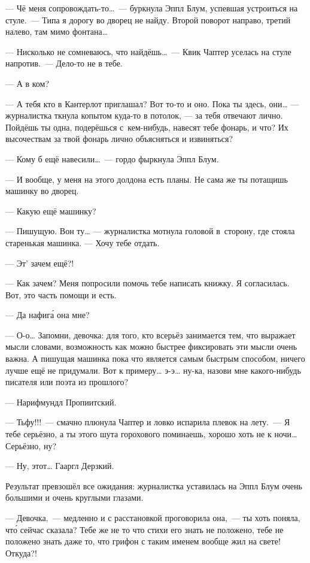 \documentclass[fontsize=11pt,a5paper,titlepage=firstcover]{scrbook}
\begin{document}
--- Чё меня сопровождать-то{\ldots}~--- буркнула Эппл Блум, успевшая устроиться на стуле.~--- Типа я дорогу во дворец не найду. Второй поворот направо, третий налево, там мимо фонтана{\ldots}

--- Нисколько не сомневаюсь, что найдёшь{\ldots}~--- Квик Чаптер уселась на стуле напротив.~--- Дело-то не в тебе.

--- А в ком?

--- А тебя кто в Кантерлот приглашал? Вот то-то и оно. Пока ты здесь, они{\ldots} --- журналистка ткнула копытом куда-то в потолок, --- за тебя отвечают лично. Пойдёшь ты одна, подерёшься с~кем-нибудь, навесят тебе фонарь, и что? Их высочествам за твой фонарь лично объясняться и извиняться?

--- Кому б ещё навесили{\ldots}~--- гордо фыркнула Эппл Блум.

--- И вообще, у меня на этого долдона есть планы. Не сама же ты потащишь машинку во дворец.

--- Какую ещё машинку?

--- Пишущую. Вон ту{\ldots} --- журналистка мотнула головой в~сторону, где стояла старенькая машинка. --- Хочу тебе отдать.

--- Эт’ зачем ещё?!

--- Как зачем? Меня попросили помочь тебе написать книжку. Я согласилась. Вот, это часть помощи и есть.

--- Да нафига́ она мне?

--- О-о{\ldots} Запомни, девочка: для того, кто всерьёз занимается тем, что выражает мысли словами, возможность как можно быстрее фиксировать эти мысли очень важна. А пишущая машинка пока что является самым быстрым способом, ничего лучше ещё не придумали. Вот к примеру{\ldots} э-э{\ldots} ну-ка, назови мне какого-нибудь писателя или поэта из прошлого?

--- Нарифмундл Пропиитский.

--- Тьфу!!!~--- смачно плюнула Чаптер и ловко испарила плевок на лету.~--- Я тебе серьёзно, а ты этого шута горохового поминаешь, хорошо хоть не к ночи{\ldots} Серьёзно, ну?

--- Ну, этот{\ldots} Гааргл Дерзкий.

Результат превзошёл все ожидания: журналистка уставилась на Эппл Блум очень большими и очень круглыми глазами.

--- Девочка,~--- медленно и с расстановкой проговорила она,~--- ты хоть поняла, что́ сейчас сказала? Тебе же не то что стихи его знать не положено, тебе не положено знать даже то, что грифон с таким именем вообще жил на свете! Откуда?!
\end{document}
